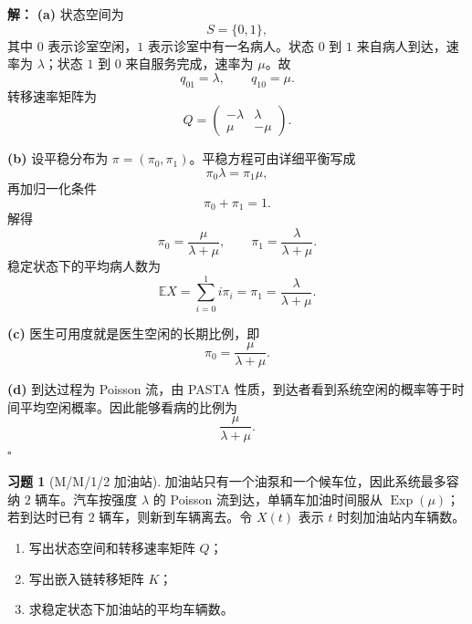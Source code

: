 \documentclass[12pt,a4paper,openany]{ctexrep}
\theoremstyle{definition}
\newtheorem{exercise}{习题}[section]
\newenvironment{solution}{\par\noindent\textbf{解：}}{\hfill$\square$\par}
\newcommand{\E}{\mathbb{E}}
\newcommand{\Exp}{\operatorname{Exp}}
\begin{document}
\begin{solution}
\textbf{(a)} 状态空间为
\[
S=\{0,1\},
\]
其中 $0$ 表示诊室空闲，$1$ 表示诊室中有一名病人。状态 $0$ 到 $1$ 来自病人到达，速率为 $\lambda$；状态 $1$ 到 $0$ 来自服务完成，速率为 $\mu$。故
\[
q_{01}=\lambda,\qquad q_{10}=\mu.
\]
转移速率矩阵为
\[
Q=
\begin{pmatrix}
-\lambda&\lambda\\
\mu&-\mu
\end{pmatrix}.
\]

\textbf{(b)} 设平稳分布为 $\pi=(\pi_0,\pi_1)$。平稳方程可由详细平衡写成
\[
\pi_0\lambda=\pi_1\mu,
\]
再加归一化条件
\[
\pi_0+\pi_1=1.
\]
解得
\[
\pi_0=\frac{\mu}{\lambda+\mu},\qquad
\pi_1=\frac{\lambda}{\lambda+\mu}.
\]
稳定状态下的平均病人数为
\[
\E X=\sum_{i=0}^{1}i\pi_i=\pi_1=\frac{\lambda}{\lambda+\mu}.
\]

\textbf{(c)} 医生可用度就是医生空闲的长期比例，即
\[
\pi_0=\frac{\mu}{\lambda+\mu}.
\]

\textbf{(d)} 到达过程为 Poisson 流，由 PASTA 性质，到达者看到系统空闲的概率等于时间平均空闲概率。因此能够看病的比例为
\[
\frac{\mu}{\lambda+\mu}.
\]
\end{solution}

\begin{exercise}[M/M/1/2 加油站]
加油站只有一个油泵和一个候车位，因此系统最多容纳 $2$ 辆车。汽车按强度 $\lambda$ 的 Poisson 流到达，单辆车加油时间服从 $\Exp(\mu)$；若到达时已有 $2$ 辆车，则新到车辆离去。令 $X(t)$ 表示 $t$ 时刻加油站内车辆数。
\begin{enumerate}[label=(\alph*)]
	\item 写出状态空间和转移速率矩阵 $Q$；
	\item 写出嵌入链转移矩阵 $K$；
	\item 求稳定状态下加油站的平均车辆数。
\end{enumerate}
\end{exercise}
\end{document}
